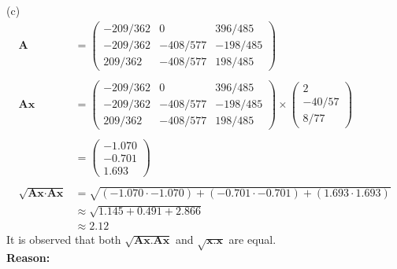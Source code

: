 \documentclass[12pt,letterpaper,fleqn]{article}
\theoremstyle{definition}
\begin{document}
\newpage
(c) 
\begin{equation*}
\begin{split}
\textbf{A} &= 
\begin{pmatrix}
-209/362 &0 &396/485\\
-209/362 &-408/577 &-198/485\\
209/362 &-408/577 &198/485
\end{pmatrix}\\
\\
\textbf{Ax} &= 
\begin{pmatrix}
-209/362 &0 &396/485\\
-209/362 &-408/577 &-198/485\\
209/362 &-408/577 &198/485
\end{pmatrix}
\times 
\begin{pmatrix}
2\\
-40/57\\
8/77
\end{pmatrix}\\
\\
&= \begin{pmatrix}
-1.070\\
-0.701\\
1.693
\end{pmatrix}\\
\\
\sqrt{\textbf{Ax}\cdot\textbf{Ax}} &= \sqrt{ (-1.070\cdot-1.070) + (-0.701\cdot-0.701) + (1.693\cdot1.693)}\\
&\approx \sqrt{1.145 + 0.491 + 2.866}\\
&\approx 2.12
\end{split}
\end{equation*}
It is observed that both $\sqrt{\textbf{Ax.Ax}}$ and $\sqrt{\textbf{x.x}}$ are equal.\\
\bf{Reason:}
\end{document}
